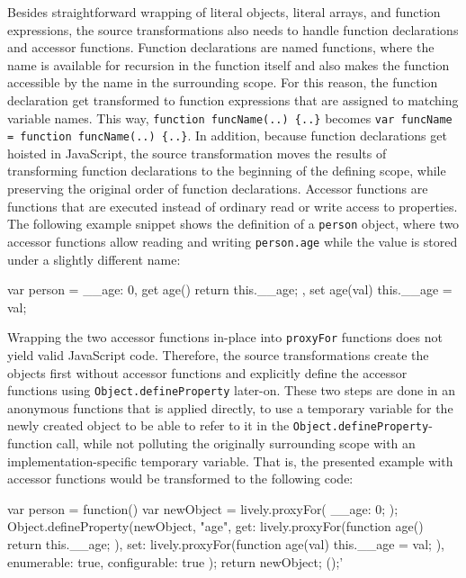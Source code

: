 Besides straightforward wrapping of literal objects, literal arrays, and function expressions, the source transformations also needs to handle function declarations and accessor functions.
Function declarations are named functions, where the name is available for recursion in the function itself and also makes the function accessible by the name in the surrounding scope.
For this reason, the function declaration get transformed to function expressions that are assigned to matching variable names.
This way, \lstinline|function funcName(..) {..}| becomes \lstinline|var funcName = function funcName(..) {..}|.
In addition, because function declarations get hoisted in JavaScript, the source transformation moves the results of transforming function declarations to the beginning of the defining scope, while preserving the original order of function declarations.
Accessor functions are functions that are executed instead of ordinary read or write access to properties.
The following example snippet shows the definition of a \lstinline{person} object, where two accessor functions allow reading and writing \lstinline{person.age} while the value is stored under a slightly different name: \\
\iffalse
\begin{verbatim}\fi
\begin{code}{}{}
var person = {
    __age: 0,
    get age() {
        return this.__age;
    },
    set age(val) {
        this.__age = val;
    }
}
\end{code}
\iffalse
\end{verbatim}\fi

Wrapping the two accessor functions in-place into \lstinline{proxyFor} functions does not yield valid JavaScript code.
Therefore, the source transformations create the objects first without accessor functions and explicitly define the accessor functions using \lstinline{Object.defineProperty} later-on.
These two steps are done in an anonymous functions that is applied directly, to use a temporary variable for the newly created object to be able to refer to it in the \lstinline{Object.defineProperty}-function call, while not polluting the originally surrounding scope with an implementation-specific temporary variable.
That is, the presented example with accessor functions would be transformed to the following code: \\

\iffalse
\begin{verbatim}\fi
\begin{code}{}{}
var person = function() {
    var newObject = lively.proxyFor({
        __age: 0;
    });
    Object.defineProperty(newObject, "age", {
        get: lively.proxyFor(function age() {
            return this.__age;
        }),
        set: lively.proxyFor(function age(val) {
            this.__age = val;
        }),
        enumerable: true,
        configurable: true
    });
    return newObject;
}();'
\end{code}
\iffalse
\end{verbatim}\fi


